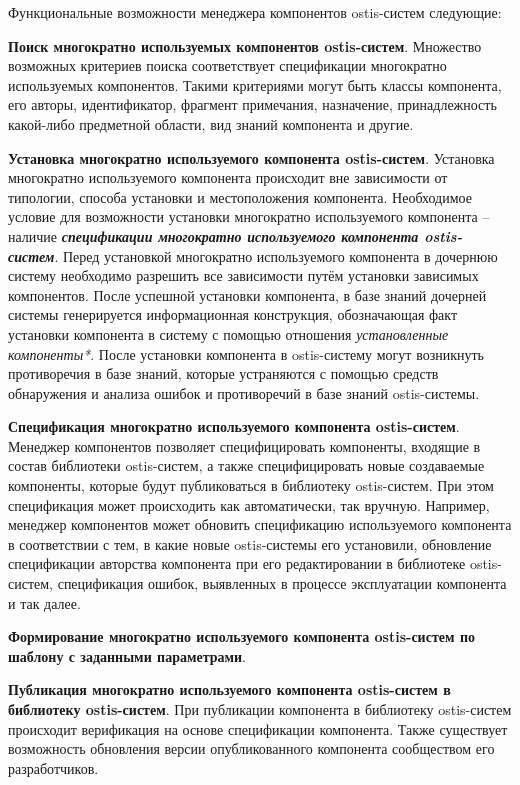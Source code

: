 Функциональные возможности менеджера компонентов ostis-систем следующие:
\begin{textitemize}
	\item{\textbf{Поиск многократно используемых компонентов ostis-систем}. Множество возможных критериев поиска соответствует спецификации многократно используемых компонентов. Такими критериями могут быть классы компонента, его авторы, идентификатор, фрагмент примечания, назначение, принадлежность какой-либо предметной области, вид знаний компонента и другие.}
	\item{\textbf{Установка многократно используемого компонента ostis-систем}. Установка многократно используемого компонента происходит вне зависимости от типологии, способа установки и местоположения компонента. Необходимое условие для возможности установки многократно используемого компонента -- наличие \textbf{\textit{спецификации многократно используемого компонента ostis-систем}}. Перед установкой многократно используемого компонента в дочернюю систему необходимо разрешить все зависимости путём установки зависимых компонентов. После успешной установки компонента, в базе знаний дочерней системы генерируется информационная конструкция, обозначающая факт установки компонента в систему с помощью отношения \textit{установленные компоненты*}. После установки компонента в ostis-систему могут возникнуть противоречия в базе знаний, которые  устраняются с помощью средств обнаружения и анализа ошибок и противоречий в базе знаний ostis-системы.}
	\item{\textbf{Спецификация многократно используемого компонента ostis-систем}. Менеджер компонентов позволяет специфицировать компоненты, входящие в состав библиотеки ostis-систем, а также специфицировать новые создаваемые компоненты, которые будут публиковаться в библиотеку ostis-систем. При этом спецификация может происходить как автоматически, так вручную. Например, менеджер компонентов может обновить спецификацию используемого компонента в соответствии с тем, в какие новые ostis-системы его установили, обновление спецификации авторства компонента при его редактировании в библиотеке ostis-систем, спецификация ошибок, выявленных в процессе эксплуатации компонента и так далее.}
	\item{\textbf{Формирование многократно используемого компонента ostis-систем по шаблону с заданными параметрами}.}
	\item{\textbf{Публикация многократно используемого компонента ostis-систем в библиотеку ostis-систем}. При публикации компонента в библиотеку ostis-систем происходит верификация на основе спецификации компонента. Также существует возможность обновления версии опубликованного компонента сообществом его разработчиков.}

\end{textitemize}
